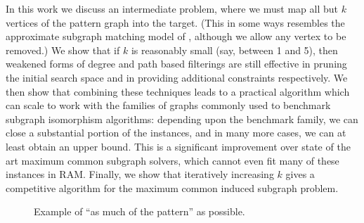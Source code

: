 \documentclass[letterpaper]{article}
\newcommand{\citet}[1]{\citeauthor{#1} \shortcite{#1}}
\theoremstyle{definition}
\begin{document}
In this work we discuss an intermediate problem, where we must map all but $k$ vertices of the
pattern graph into the target. (This in some ways resembles the approximate subgraph matching model
of \citet{DBLP:conf/cp/ZampelliDD05}, although we allow any vertex to be removed.) We show that if
$k$ is reasonably small (say, between 1 and 5), then weakened forms of degree and path based
filterings are still effective in pruning the initial search space and in providing additional
constraints respectively. We then show that combining these techniques leads to a practical
algorithm which can scale to work with the families of graphs commonly used to benchmark subgraph
isomorphism algorithms: depending upon the benchmark family, we can close a substantial portion of
the instances, and in many more cases, we can at least obtain an upper bound. This is a significant
improvement over state of the art maximum common subgraph solvers, which cannot even fit many of
these instances in RAM. Finally, we show that iteratively increasing $k$ gives a competitive
algorithm for the maximum common induced subgraph problem.

\begin{figure}
    \begin{center}
        \caption{Example of  ``as much of the pattern'' as possible.}
        \label{fig:subgraphexample}
    \end{center}
\end{figure}
\end{document}
